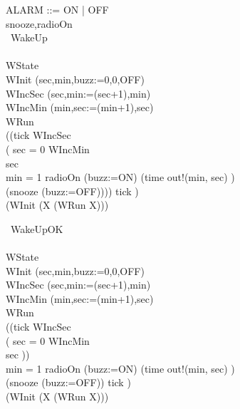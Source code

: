 \begin{circus}
ALARM ::= ON | OFF\\
\circchannel snooze,radioOn\\

\circprocess\ WakeUp \circdef\\
\circbegin\\
\circstate WState \\
WInit \circdef (sec,min,buzz:=0,0,OFF)\\
WIncSec \circdef (sec,min:=(sec+1),min)\\
WIncMin \circdef (min,sec:=(min+1),sec)\\
WRun \circdef \\
((tick \then WIncSec \circseq \\
    ( \lcircguard sec = 0 \rcircguard \circguard WIncMin\\
    \extchoice \lcircguard sec  \rcircguard \circguard \Skip\\
    \extchoice \lcircguard min = 1 \rcircguard \circguard radioOn \then (buzz:=ON)
    \extchoice (time \then out!(min, sec) \then \Skip)\\
    \extchoice (snooze \then (buzz:=OFF)))) \circhide \lchanset tick \rchanset)
\\
\circspot (WInit \circseq (\circmu X \circspot (WRun \circseq X)))\\
\circend
\end{circus}
\begin{circus}

  \circprocess\ WakeUpOK \circdef\\
  \circbegin\\
  \circstate WState \\
  WInit \circdef (sec,min,buzz:=0,0,OFF)\\
  WIncSec \circdef (sec,min:=(sec+1),min)\\
  WIncMin \circdef (min,sec:=(min+1),sec)\\
  WRun \circdef \\
  ((tick \then WIncSec \circseq \\
  		( \lcircguard sec = 0 \rcircguard \circguard WIncMin\\
  		\extchoice \lcircguard sec  \rcircguard \circguard \Skip))\\
  		\extchoice \lcircguard min = 1 \rcircguard \circguard radioOn \then (buzz:=ON)
  		\extchoice (time \then out!(min, sec) \then \Skip)\\
  		\extchoice (snooze \then (buzz:=OFF)) \circhide \lchanset tick \rchanset)
  \\
  \circspot (WInit \circseq (\circmu X \circspot (WRun \circseq X)))\\
  \circend
\end{circus}
